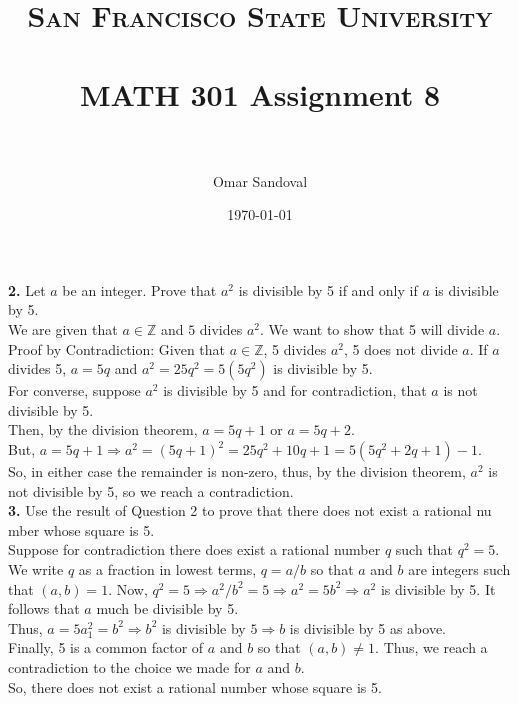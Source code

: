 \documentclass[paper=letter, fontsize=11pt]{scrartcl} %
\title{	
\normalfont \normalsize 
\textsc{San Francisco State University} \\ [25pt]
\horrule{0.5pt} \\[0.4cm] %
\huge MATH 301 Assignment 8 \\ %
\horrule{2pt} \\[0.5cm] %
}
\author{Omar Sandoval}
\date{\normalsize\today}
\begin{document}
\maketitle

\textbf{2.} Let $a$ be an integer. Prove that $a^2$ is divisible by 5 if and only if $a$ 
is divisible by 5. \\

We are given that $a \in \mathbb{Z}$ and $5$ divides $a^2$. We want to show that 5 will 
divide $a$. \\
Proof by Contradiction: Given that $a \in \mathbb{Z}$, 5 divides $a^2$, 5 does not divide
$a$.
If $a$ divides 5, $a = 5q$ and $a^2 = 25q^2 = 5(5q^2)$ is divisible by 5. \\
For converse, suppose $a^2$ is divisible by 5 and for contradiction, that $a$ is not 
divisible by 5. \\
Then, by the division theorem, $a = 5q + 1$ or $a = 5q + 2$. \\
But, $a = 5q+1 \Rightarrow a^2 = (5q+1)^2 = 25q^2 + 10q + 1 = 5(5q^2 + 2q + 1) - 1$. \\

So, in either case the remainder is non-zero, thus, by the division theorem, $a^2$ is not
divisible by 5, so we reach a contradiction. \\

\textbf{3.} Use the result of Question 2 to prove that there does not exist a rational nu
mber whose square is 5. \\ 

Suppose for contradiction there does exist a rational number $q$ such that $q^2 = 5$.
We write $q$ as a fraction in lowest terms, $q = a/b$ so that $a$ and $b$ are integers 
such that $(a,b) = 1$. Now, $q^2 = 5 \Rightarrow a^2/b^2 = 5 \Rightarrow a^2 = 5b^2 
\Rightarrow a^2$ is divisible by 5. It follows that $a$ much be divisible by 5. \\
Thus, $a = 5a_1^2 = b^2 \Rightarrow b^2$ is divisible by $5 \Rightarrow b$ is 
divisible by 5 as above. \\
Finally, 5 is a common factor of $a$ and $b$ so that $(a,b) \not= 1$. Thus, we reach 
a contradiction to the choice we made for $a$ and $b$. \\
So, there does not exist a rational number whose square is 5. \\
\end{document}
